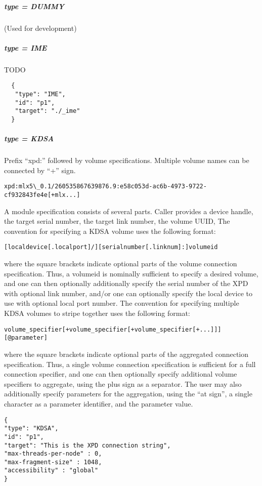 \subparagraph{type = DUMMY}

(Used for development)

\subparagraph{type = IME}
  TODO

  \begin{lstlisting}
  {
   "type": "IME",
   "id": "p1",
   "target": "./_ime"
  }
  \end{lstlisting}

\subparagraph{type = KDSA}

Prefix ``xpd:'' followed by volume specifications. Multiple volume names can be connected by ``+'' sign.

\begin{lstlisting}
xpd:mlx5\_0.1/260535867639876.9:e58c053d-ac6b-4973-9722-cf932843fe4e[+mlx...]
\end{lstlisting}

A module specification consists of several parts.
Caller provides a device handle, the target serial number, the target link number, the volume UUID,
The convention for specifying a KDSA volume uses the following format:

\begin{lstlisting}
[localdevice[.localport]/][serialnumber[.linknum]:]volumeid
\end{lstlisting}

where the square brackets indicate optional parts of the volume connection specification.
Thus, a volumeid is nominally sufficient to specify a desired volume, and one can then optionally additionally 
specify the serial number of the XPD with optional link number, and/or one can optionally specify the local 
device to use with optional local port number.
The convention for specifying multiple KDSA volumes to stripe together uses the following format:

\begin{lstlisting}
volume_specifier[+volume_specifier[+volume_specifier[+...]]][@parameter]
\end{lstlisting}

where the square brackets indicate optional parts of the aggregated connection specification. Thus, a single
volume connection specification is sufficient for a full connection specifier, and one can then optionally specify
additional volume specifiers to aggregate, using the plus sign as a separator. The user may also additionally
specify parameters for the aggregation, using the “at sign”, a single character as a parameter identifier, and the
parameter value.

\begin{lstlisting}
{
"type": "KDSA",
"id": "p1",
"target": "This is the XPD connection string",
"max-threads-per-node" : 0,
"max-fragment-size" : 1048,
"accessibility" : "global"
}
\end{lstlisting}


